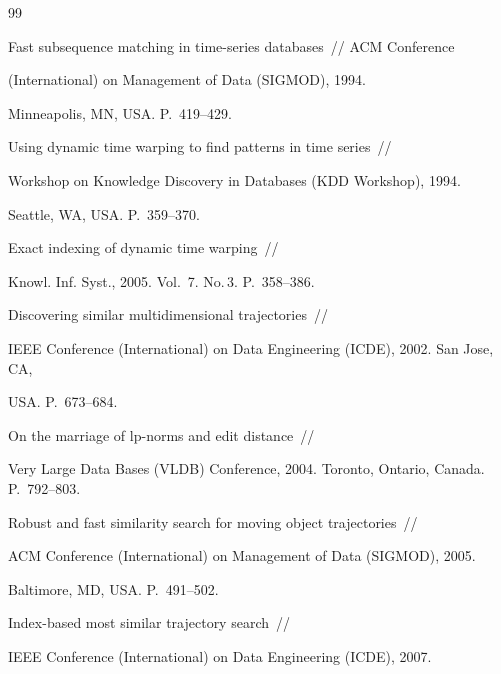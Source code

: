{{\begin{thebibliography}{99}

Fast subsequence matching in time-series databases~/\!\!/ ACM Conference 

(International) on Management of Data (SIGMOD), 1994. 

Minneapolis, MN, USA.  P.~419--429.



Using dynamic time warping to find patterns in time series~/\!\!/ 

Workshop on Knowledge Discovery in Databases (KDD Workshop), 1994. 

Seattle, WA, USA. P.~359--370.


 Exact indexing of dynamic time warping~/\!\!/ 

Knowl. Inf. Syst., 2005. Vol.~7. No.\,3. P.~358--386.



Discovering similar multidimensional trajectories~/\!\!/ 

IEEE  Conference (International) on Data Engineering (ICDE), 2002. San Jose, CA,

USA. P.~673--684.


 On the marriage of lp-norms and edit distance~/\!\!/ 

Very Large Data Bases (VLDB) Conference, 2004.  Toronto, Ontario, Canada.   P.~792--803.



Robust and fast similarity search for moving object trajectories~/\!\!/ 

ACM  Conference (International) on Management of Data (SIGMOD), 2005. 

Baltimore, MD, USA. P.~491--502.



Index-based most similar trajectory search~/\!\!/ 

IEEE Conference (International) on Data Engineering (ICDE), 2007. 


\end{thebibliography}}}
